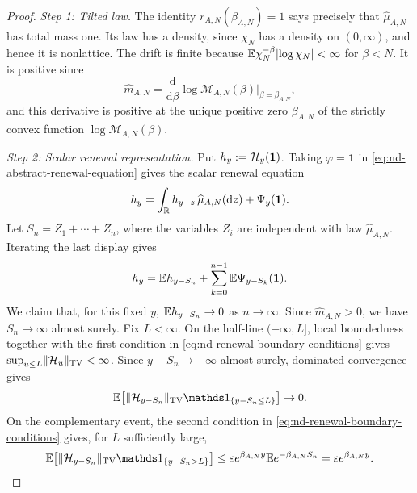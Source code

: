 \documentclass[11pt,reqno,a4paper]{article}
\newcommand{\Ee}{\E}
\begin{document}
\begin{proof}
  \emph{Step 1: Tilted law.}
  The identity $r_{A,N}(\beta_{A,N})=1$ says precisely that
  $\widehat\mu_{A,N}$ has total mass one. Its law has a density, since
  $\chi_N$ has a density on $(0,\infty)$, and hence it is nonlattice. The
  drift is finite because $\Ee\chi_N^{-\beta}\abs{\log\chi_N}<\infty$ for
  $\beta<N$. It is positive since
  \begin{equation*}
    \widehat m_{A,N}
    =
    \frac{\mathrm{d}}{\mathrm{d}\beta}
    \log\mathcal M_{A,N}(\beta)\bigg|_{\beta=\beta_{A,N}},
  \end{equation*}
  and this derivative is positive at the unique positive zero
  $\beta_{A,N}$ of the strictly convex function
  $\log\mathcal M_{A,N}(\beta)$.

  \emph{Step 2: Scalar renewal representation.}
  Put $h_y:=\mathcal H_y(\mathbf 1)$. Taking $\varphi=\mathbf 1$ in
  \cref{eq:nd-abstract-renewal-equation} gives the scalar renewal equation
  \begin{equation*}
    h_y
    =
    \int_{\mathbb{R}} h_{y-z}\,\widehat\mu_{A,N}(\mathrm{d}z)
    +
    \Psi_y(\mathbf 1).
  \end{equation*}
  Let $S_n=Z_1+\cdots+Z_n$, where the variables $Z_i$ are independent with law
  $\widehat\mu_{A,N}$. Iterating the last display gives
  \begin{equation*}
    h_y
    =
    \Ee h_{y-S_n}
    +
    \sum_{k=0}^{n-1}
    \Ee\Psi_{y-S_k}(\mathbf 1).
  \end{equation*}
  We claim that, for this fixed $y$,
  $\Ee h_{y-S_n}\to0$ as $n\to\infty$. Since
  $\widehat m_{A,N}>0$, we have $S_n\to\infty$ almost surely. Fix $L<\infty$.
  On the half-line $(-\infty,L]$, local boundedness together with
  the first condition in \cref{eq:nd-renewal-boundary-conditions} gives
  $\sup_{u\leq L}\lVert\mathcal H_u\rVert_{\mathrm{TV}}<\infty$. Since
  $y-S_n\to-\infty$ almost surely, dominated convergence gives
  \begin{equation*}
    \Ee\left[
      \norm{\Hcal_{y-S_n}}_{\mathrm{TV}}
      \one_{\{y-S_n\leq L\}}
    \right]
    \to0 .
  \end{equation*}
  On the complementary event,
  the second condition in \cref{eq:nd-renewal-boundary-conditions} gives, for
  $L$ sufficiently large,
  \begin{equation*}
    \Ee\left[
      \norm{\Hcal_{y-S_n}}_{\mathrm{TV}}
      \one_{\{y-S_n>L\}}
    \right]
    \leq
    \varepsilon e^{\beta_{A,N}y}
    \Ee e^{-\beta_{A,N}S_n}
    =
    \varepsilon e^{\beta_{A,N}y}.

\end{equation*}
\end{proof}
\end{document}
